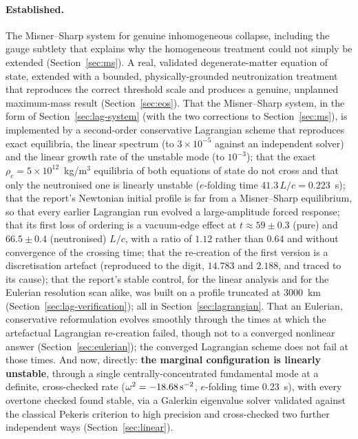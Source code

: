\documentclass[11pt]{article}
\begin{document}
\paragraph{Established.} The Misner--Sharp system for genuine inhomogeneous collapse, including the gauge subtlety that explains why the homogeneous treatment could not simply be extended (Section~\ref{sec:ms}). A real, validated degenerate-matter equation of state, extended with a bounded, physically-grounded neutronization treatment that reproduces the correct threshold scale and produces a genuine, unplanned maximum-mass result (Section~\ref{sec:eos}). That the Misner--Sharp system, in the form of Section~\ref{sec:lag-system} (with the two corrections to Section~\ref{sec:ms}), is implemented by a second-order conservative Lagrangian scheme that reproduces exact equilibria, the linear spectrum (to $3\times10^{-5}$ against an independent solver) and the linear growth rate of the unstable mode (to $10^{-3}$); that the exact $\rho_c=5\times10^{12}$~kg/m$^3$ equilibria of both equations of state do not cross and that only the neutronised one is linearly unstable ($e$-folding time $41.3\,L/c=0.223$~s); that the report's Newtonian initial profile is far from a Misner--Sharp equilibrium, so that every earlier Lagrangian run evolved a large-amplitude forced response; that its first loss of ordering is a vacuum-edge effect at $t\approx59\pm0.3$ (pure) and $66.5\pm0.4$ (neutronised) $L/c$, with a ratio of $1.12$ rather than $0.64$ and without convergence of the crossing time; that the re-creation of the first version is a discretisation artefact (reproduced to the digit, $14.783$ and $2.188$, and traced to its cause); that the report's stable control, for the linear analysis and for the Eulerian resolution scan alike, was built on a profile truncated at $3000$~km (Section~\ref{sec:lag-verification}); all in Section~\ref{sec:lagrangian}. That an Eulerian, conservative reformulation evolves smoothly through the times at which the artefactual Lagrangian re-creation failed, though not to a converged nonlinear answer (Section~\ref{sec:eulerian}); the converged Lagrangian scheme does not fail at those times. And now, directly: \textbf{the marginal configuration is linearly unstable}, through a single centrally-concentrated fundamental mode at a definite, cross-checked rate ($\omega^2=-18.68\,{\rm s}^{-2}$, $e$-folding time $0.23$~s), with every overtone checked found stable, via a Galerkin eigenvalue solver validated against the classical Pekeris criterion to high precision and cross-checked two further independent ways (Section~\ref{sec:linear}).
\end{document}
